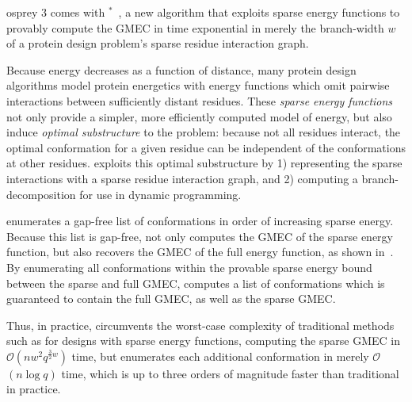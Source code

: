 \def\Oh{$\mathcal{O}$}

{\sc osprey} 3 comes with \bwmstar$^*$~\cite{BWM_JCB}, a new algorithm that exploits sparse energy functions to provably compute the GMEC in time exponential in merely the branch-width $w$ of a protein design problem's sparse residue interaction graph.

Because energy decreases as a function of distance, many protein design algorithms model protein energetics with energy functions which omit pairwise interactions between sufficiently distant residues. These \emph{sparse energy functions} not only provide a simpler, more efficiently computed model of energy, but also induce \emph{optimal substructure} to the problem: because not all residues interact, the optimal conformation for a given residue can be independent of the conformations at other residues. \bwmstar exploits this optimal substructure by 1) representing the sparse interactions with a sparse residue interaction graph, and 2) computing a branch-decomposition for use in dynamic programming. 

\bwmstar enumerates a gap-free list of conformations in order of increasing sparse energy. Because this list is gap-free, \bwmstar not only computes the GMEC of the sparse energy function, but also recovers the GMEC of the full energy function, as shown in~\cite{BWM_JCB}. By enumerating all conformations within the provable sparse energy bound between the sparse and full GMEC, \bwmstar computes a list of conformations which is guaranteed to contain the full GMEC, as well as the sparse GMEC.

Thus, in practice, \bwmstar circumvents the worst-case complexity of traditional methods such as \as for designs with sparse energy functions, computing the sparse GMEC in \Oh$(nw^2q^{\frac{3}{2}w})$ time, but enumerates each additional conformation in merely \Oh$(n\log q)$ time, which is up to three orders of magnitude faster than traditional \as in practice.